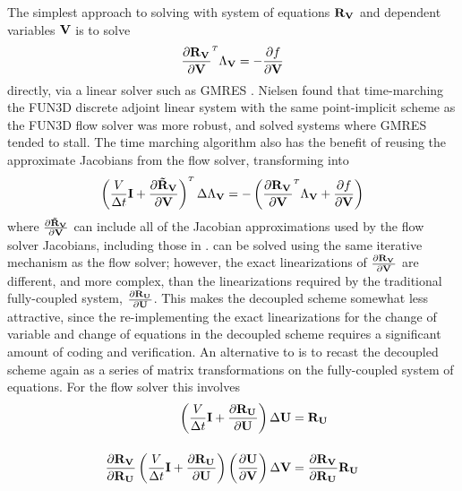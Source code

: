 The simplest approach to solving  with system of equations
$\mathbf R_{{\mathbf V}_{}}$ and dependent variables $\mathbf V$ is to solve
\begin{equation}
  \pd{\rv{}}{\mv}^{\mathsmaller T}\adjlam{\mv} = -\pd{f}{\mv}
  \label{v-adj}
\end{equation}
directly, via a linear solver such as GMRES \cite{saad1986gmres}.  Nielsen
\cite{nielsenPhD} found that time-marching the FUN3D discrete adjoint linear
system with the same point-implicit scheme as the FUN3D flow solver was more
robust, and solved systems where GMRES tended to stall.  The time marching
algorithm also has the benefit of reusing the approximate Jacobians from the
flow solver, transforming  into
\begin{equation}
  \left(
    \frac{V}{\Delta t} \mi + \drvdv
  \right)^{\mathsmaller T}
  \Delta \adjlam{\mv}
  =
  -\left(\pd{\rv{}}{\mv}^{\mathsmaller T}\adjlam{\mv} + \pd{f}{\mv} \right)
  \label{v-adj-time}
\end{equation}
where $\frac{\partial \mathbf{\tilde{R}_{\mathbf V}}}{\partial \mathbf V}$ can include all of the Jacobian approximations used by the flow
solver Jacobians, including those in .
 can be solved using the same iterative mechanism
as the flow solver; however, the exact linearizations of $\frac{\partial \mathbf R_{{\mathbf V}_{}}}{\partial \mathbf V}$
are different, and more complex, than the linearizations required by the
traditional fully-coupled system, $\frac{\partial \mathbf R_{{\mathbf U}_{}}}{\partial \mathbf U}$.  This makes the decoupled
scheme somewhat less attractive, since the re-implementing the exact
linearizations for the change of variable and change of equations in the
decoupled scheme requires a significant amount of coding and verification.  An
alternative to  is to recast the decoupled scheme again as a
series of matrix transformations on the fully-coupled system of equations.  For
the flow solver this involves
\begin{equation}
  \begin{aligned}
    \left( \frac{V}{\Delta t} \mathbf I + \frac{\partial \mathbf R_{{\mathbf U}_{}}}{\partial \mathbf U} \right) \Delta \mathbf U &= \mathbf R_{{\mathbf U}_{}} \\[12pt]
    \frac{\partial \mathbf R_{{\mathbf V}_{}}}{\partial \mathbf R_{{\mathbf U}_{}}}
    \left( \frac{V}{\Delta t} \mathbf I + \frac{\partial \mathbf R_{{\mathbf U}_{}}}{\partial \mathbf U} \right)
    \left( \frac{\partial \mathbf U}{\partial \mathbf V} \right) \Delta \mathbf V
    &= 
    \frac{\partial \mathbf R_{{\mathbf V}_{}}}{\partial \mathbf R_{{\mathbf U}_{}}} \mathbf R_{{\mathbf U}_{}}
  \end{aligned}
  \label{fc-to-dc-flow}
\end{equation}
